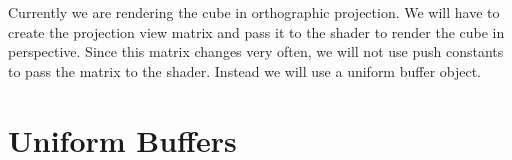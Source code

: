 \documentclass[12pt]{report} \usepackage{preamble}
\begin{document}
Currently we are rendering the cube in orthographic projection. We will have to create the projection view matrix and pass it to the shader to render the cube in perspective.
Since this matrix changes very often, we will not use push constants to pass the matrix to the shader. Instead we will use a uniform buffer object.

\section{Uniform Buffers}

\listoffigures

\printbibliography[
	heading=bibintoc, title={Bibliography}
]
\end{document}
